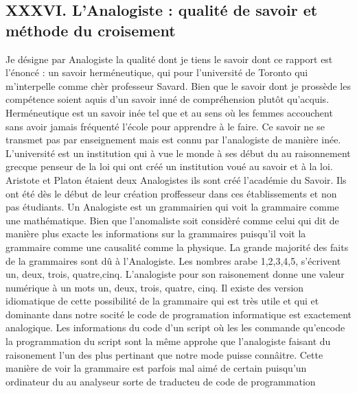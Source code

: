 \documentclass[12pt,a4paper]{article}
\begin{document}
\subsection*{XXXVI. L’Analogiste : qualité de savoir et méthode du croisement}
Je désigne par Analogiste la qualité dont je tiens le savoir dont ce rapport est l’énoncé : un savoir herméneutique, qui pour l'université de Toronto qui m'interpelle comme chèr professeur Savard. Bien que le savoir dont je prossède les compétence soient aquis d'un savoir inné de compréhension plutôt qu’acquis. Herméneutique est un savoir inée tel que et au sens où les femmes accouchent sans avoir jamais fréquenté l’école pour apprendre à le faire. Ce savoir ne se transmet pas par enseignement mais est connu par l'analogiste de manière inée. L'université est un institution qui à vue le monde à ses début du au raisonnement grecque penseur de la loi qui ont créé un institution voué au savoir et à la loi. Aristote et Platon étaient deux Analogistes ils sont créé l'académie du Savoir. Ils ont été dès le début de leur création proffesseur dans ces établissements et non pas étudiants. Un Analogiste est un grammairien qui voit la grammaire
comme une mathématique. Bien que l'anomaliste soit considèré comme celui qui dit de manière plus exacte les informations sur la grammaires puisqu'il voit la grammaire comme une causalité comme la physique. La grande majorité des faits de la grammaires sont dû à l'Analogiste. Les nombres arabe 1,2,3,4,5, s'écrivent un, deux, trois, quatre,cinq. L'analogiste pour son raisonement donne une valeur numérique à un mots un, deux, trois, quatre, cinq. Il existe des version idiomatique de cette possibilité de la grammaire qui est très utile et qui et dominante dans notre socité le code de programation informatique est exactement analogique. Les informations du code d'un script où les les commande qu'encode la programmation du script sont la même approhe que l'analogiste faisant du raisonement l'un des plus pertinant que notre mode puisse connâitre. Cette manière de voir la grammaire est parfois mal aimé de certain puisqu'un ordinateur du au analyseur sorte de traducteu de code de programmation 
\end{document}

